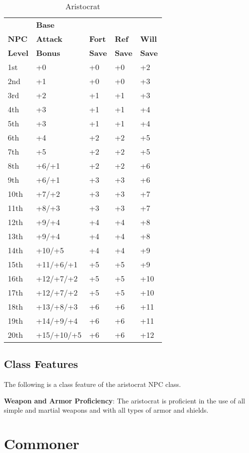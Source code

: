 \begin{table}[]
\sffamily
\caption{Aristocrat}
\begin{tabular}{lllll}
               & \textbf{Base} \\
\textbf{NPC}   & \textbf{Attack} & \textbf{Fort} & \textbf{Ref} & \textbf{Will}\\
\textbf{Level} & \textbf{Bonus} & \textbf{Save} & \textbf{Save} & \textbf{Save}\\
1st & +0 & +0 & +0 & +2\\
2nd & +1 & +0 & +0 & +3\\
3rd & +2 & +1 & +1 & +3\\
4th & +3 & +1 & +1 & +4\\
5th & +3 & +1 & +1 & +4\\
6th & +4 & +2 & +2 & +5\\
7th & +5 & +2 & +2 & +5\\
8th & +6/+1 & +2 & +2 & +6\\
9th & +6/+1 & +3 & +3 & +6\\
10th & +7/+2 & +3 & +3 & +7\\
11th & +8/+3 & +3 & +3 & +7\\
12th & +9/+4 & +4 & +4 & +8\\
13th & +9/+4 & +4 & +4 & +8\\
14th & +10/+5 & +4 & +4 & +9\\
15th & +11/+6/+1 & +5 & +5 & +9\\
16th & +12/+7/+2 & +5 & +5 & +10\\
17th & +12/+7/+2 & +5 & +5 & +10\\
18th & +13/+8/+3 & +6 & +6 & +11\\
19th & +14/+9/+4 & +6 & +6 & +11\\
20th & +15/+10/+5 & +6 & +6 & +12\\
\end{tabular}
\end{table}

\subsection{Class Features}

				
The following is a class feature of the aristocrat NPC class.
				
\textbf{Weapon and Armor Proficiency}: The aristocrat is proficient in the use of all simple and martial weapons and with all types of armor and shields.
				
\section{Commoner}

